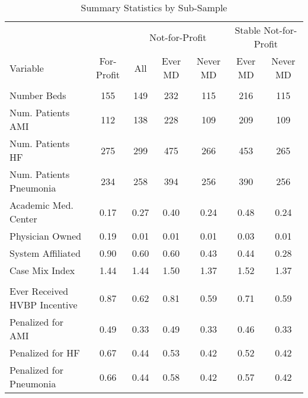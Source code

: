 \begin{table}[ht!]
\centering
\caption{\label{tab:sumstats_samples} Summary Statistics by Sub-Sample}
\centering
\begin{tabular}[t]{lcccccc}
\toprule
\multicolumn{2}{c}{ } & \multicolumn{3}{c}{Not-for-Profit} & \multicolumn{2}{c}{Stable Not-for-Profit} \\
\cmidrule(l{3pt}r{3pt}){3-5} \cmidrule(l{3pt}r{3pt}){6-7}
Variable & For-Profit & All & Ever MD & Never MD & Ever MD & Never MD\\
\midrule
\addlinespace[0.3em]
\multicolumn{7}{l}{\textbf{Hospital Characteristics}}\\
\hspace{1em}Number Beds & 155 & 149 & 232 & 115 & 216 & 115\\
\hspace{1em}Num. Patients AMI & 112 & 138 & 228 & 109 & 209 & 109\\
\hspace{1em}Num. Patients HF & 275 & 299 & 475 & 266 & 453 & 265\\
\hspace{1em}Num. Patients Pneumonia & 234 & 258 & 394 & 256 & 390 & 256\\
\hspace{1em}Academic Med. Center & 0.17 & 0.27 & 0.40 & 0.24 & 0.48 & 0.24\\
\hspace{1em}Physician Owned & 0.19 & 0.01 & 0.01 & 0.01 & 0.03 & 0.01\\
\hspace{1em}System Affiliated & 0.90 & 0.60 & 0.60 & 0.43 & 0.44 & 0.28\\
\hspace{1em}Case Mix Index & 1.44 & 1.44 & 1.50 & 1.37 & 1.52 & 1.37\\
\addlinespace[0.3em]
\multicolumn{7}{l}{\textbf{Penalty/Payment Variables}}\\
\hspace{1em}Ever Received HVBP Incentive & 0.87 & 0.62 & 0.81 & 0.59 & 0.71 & 0.59\\
\hspace{1em}Penalized for AMI & 0.49 & 0.33 & 0.49 & 0.33 & 0.46 & 0.33\\
\hspace{1em}Penalized for HF & 0.67 & 0.44 & 0.53 & 0.42 & 0.52 & 0.42\\
\hspace{1em}Penalized for Pneumonia & 0.66 & 0.44 & 0.58 & 0.42 & 0.57 & 0.42\\

\end{tabular}
\end{table}
